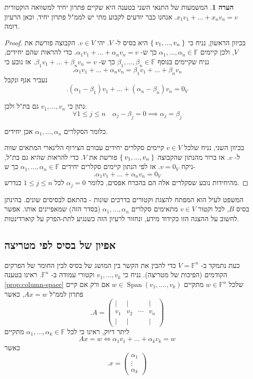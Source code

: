 \documentclass[12pt]{report}
\theoremstyle{plain}
\theoremstyle{definition}
\newtheorem{remark}{הערה}[chapter]
\newcommand{\F}{\mathbb{F}}
\newcommand{\0}{\mathbf{0}}
\DeclareMathOperator{\Span}{Span}
\begin{document}
\begin{remark}
המשמעות של התנאי השני בטענה היא שקיים פתרון יחיד למשוואה הוקטורית
$x_1v_1+...+x_nv_n=v$.
אנחנו כבר יודעים לקבוע מתי יש לממ"ל פתרון יחיד, וכאן הרעיון דומה.
\end{remark}

\begin{proof}
בכיוון הראשון, נניח כי
$\Set{v_1,...,v_n}$
היא בסיס ל-
$V$.
יהי 
$v\in V$.
הקבוצה פורשת את
$V$,
ולכן קיימים
$\alpha_1,...,\alpha_n\in\F$
כך ש-
$\alpha_1v_1+...+\alpha_nv_n=v$.
כדי להראות שהם יחידים, נניח שקיימים בנוסף
$\beta_1,...,\beta_n\in\F$
כך ש-
$\beta_1v_1+...+\beta_nv_n=v$.
אז נובע כי
$$
.\alpha_1v_1+...+\alpha_nv_n=\beta_1v_1+...+\beta_nv_n
$$
נעביר אגף ונקבל
$$
.(\alpha_1-\beta_1)v_1+...+(\alpha_n-\beta_n)v_n=0_V
$$

נתון כי 
$v_1,...,v_n$
גם בת"ל ולכן:
$$
\forall 1\leq j\leq n \quad \alpha_j-\beta_j=0 \implies \alpha_j=\beta_j
$$

כלומר הסקלרים 
$\alpha_1,...,\alpha_n$
אכן יחידים.

בכיוון השני, נניח שלכל
$v\in V$
קיימים סקלרים יחידים עבורם הצירוף הלינארי המתאים שווה ל-
$v$.
אז ברור מהנתון שהקבוצה
$\Set{v_1,...,v_n}$
פורשת את 
$V$.
כדי להראות שהיא גם בת"ל, ניקח 
$v=0_V$.
אז לפי הנתון קיימים סקלרים יחידים 
$\alpha_1,...,\alpha_n\in \F$
כך ש-
$$
.\alpha_1v_1+...+\alpha_nv_n=0_V
$$
מהיחידות נובע שסקלרים אלה הם בהכרח אפסים, כלומר
$\alpha_j=0$
לכל 
$1\leq j\leq n$
כנדרש.

\end{proof}

המשפט לעיל הוא המפתח להצגת וקטורים בדרכים שונות - בהתאם לבסיסים שונים. בהינתן בסיס
$B$,
לכל וקטור
$v\in V$
מתאימים סקלרים
$\alpha_1,...,\alpha_n$
(בסדר הזה)
שמאפיינים אותו. אפשר לחשוב על ההצגה הזו כקידוד מידע, ונחזור לרעיון הזה כשנגיע לתת-הפרק על קוארדינטות.

\subsection{אפיון של בסיס לפי מטריצה}

כעת נתמקד ב-
$V=\F^n$
כדי להבין את הקשר בין המושג של בסיס לבין החומר של הפרקים הקודמים (הפיכות של מטריצה). נניח כי 
$v_1,...,v_k$
וקטורי עמודה ב-
$\F^n$.
ראינו בטענה
\ref{prop:column-space}
שלכל 
$w\in\F^n$
מתקיים
$w\in\Span(v_1,....,v_k)$
אם ורק אם קיים פתרון לממ"ל
$Ax=w$,
כאשר
$$
.A=\begin{pmatrix}
| & | & & | \\
v_1 & v_2 & \cdots & v_n \\
| & | & & |
\end{pmatrix}
$$
ליתר דיוק, ראינו כי לכל
$\alpha_1,...,\alpha_k\in\F$
מתקיים
$$
Ax=w \iff \alpha_1v_1+...+\alpha_kv_k=w 
$$
כאשר
$$
.x=\begin{pmatrix}
\alpha_1 \\
\vdots \\
\alpha_k
\end{pmatrix}
$$
\end{document}
